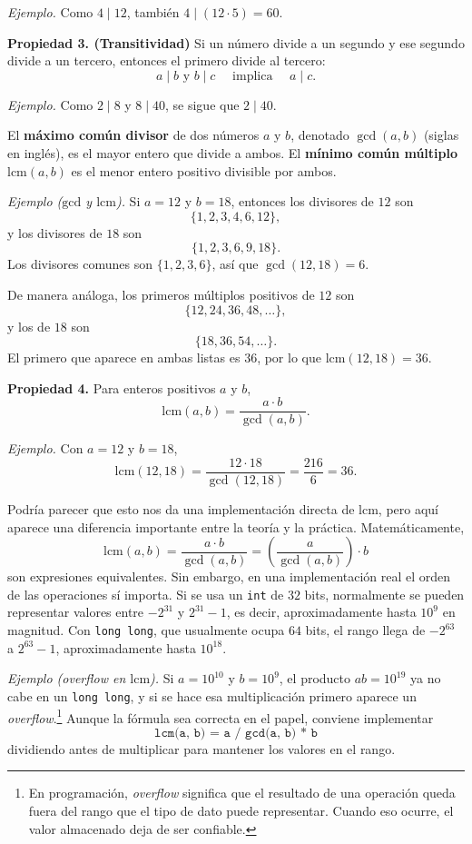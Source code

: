 \textit{Ejemplo.} Como $4 \mid 12$, también $4 \mid (12 \cdot 5) = 60$.

\textbf{Propiedad 3. (Transitividad)} Si un número divide a un segundo y ese segundo divide a un tercero, entonces el primero divide al tercero:
\[
a \mid b \text{ y } b \mid c \quad \text{ implica } \quad a \mid c.
\]

\textit{Ejemplo.} Como $2 \mid 8$ y $8 \mid 40$, se sigue que $2 \mid 40$.

El \textbf{máximo común divisor} de dos números $a$ y $b$, denotado $\gcd(a,b)$ (siglas en inglés), es el mayor entero que divide a ambos. El \textbf{mínimo común múltiplo} $\text{lcm}(a,b)$ es el menor entero positivo divisible por ambos.

\textit{Ejemplo ($\text{gcd}$ y $\text{lcm}$).} Si $a = 12$ y $b = 18$, entonces los divisores de $12$ son
\[
\{1,2,3,4,6,12\},
\]
y los divisores de $18$ son
\[
\{1,2,3,6,9,18\}.
\]
Los divisores comunes son $\{1,2,3,6\}$, así que $\gcd(12,18) = 6$.

De manera análoga, los primeros múltiplos positivos de $12$ son
\[
\{12,24,36,48,\dots\},
\]
y los de $18$ son
\[
\{18,36,54,\dots\}.
\]
El primero que aparece en ambas listas es $36$, por lo que $\text{lcm}(12,18) = 36$.

\textbf{Propiedad 4.} Para enteros positivos $a$ y $b$,
\[
\text{lcm}(a,b) = \frac{a \cdot b}{\gcd(a,b)}.
\]

\textit{Ejemplo.} Con $a = 12$ y $b = 18$,
\[
\text{lcm}(12,18) = \frac{12 \cdot 18}{\gcd(12,18)} = \frac{216}{6} = 36.
\]

Podría parecer que esto nos da una implementación directa de $\text{lcm}$, pero aquí aparece una diferencia importante entre la teoría y la práctica. Matemáticamente,
\[
\text{lcm}(a,b) = \frac{a \cdot b}{\gcd(a,b)} = \left(\frac{a}{\gcd(a,b)}\right) \cdot b
\]
son expresiones equivalentes. Sin embargo, en una implementación real el orden de las operaciones sí importa. Si se usa un \texttt{int} de $32$ bits, normalmente se pueden representar valores entre $-2^{31}$ y $2^{31}-1$, es decir, aproximadamente hasta $10^9$ en magnitud. Con \texttt{long long}, que usualmente ocupa $64$ bits, el rango llega de $-2^{63}$ a $2^{63}-1$, aproximadamente hasta $10^{18}$.

\textit{Ejemplo (\textit{overflow} en $\text{lcm}$).} Si $a = 10^{10}$ y $b = 10^9$, el producto $ab = 10^{19}$ ya no cabe en un \texttt{long long}, y si se hace esa multiplicación primero aparece un \textit{overflow}.\footnote{En programación, \textit{overflow} significa que el resultado de una operación queda fuera del rango que el tipo de dato puede representar. Cuando eso ocurre, el valor almacenado deja de ser confiable.} Aunque la fórmula sea correcta en el papel, conviene implementar
\[
\boxed{\texttt{lcm(a, b) = a / gcd(a, b) * b}}
\]
dividiendo antes de multiplicar para mantener los valores en el rango.

